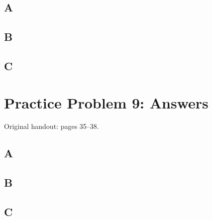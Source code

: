 \documentclass[letterpaper,12pt]{article}
\newcommand{\handout}[1]{%
  
}
\newenvironment{answer}{\par}{\par\medskip}
\begin{document}
\subsection*{A}
\begin{answer}
  \vspace{2cm}
\end{answer}

\subsection*{B}
\begin{answer}
  \vspace{2cm}
\end{answer}

\subsection*{C}
\begin{answer}
  \vspace{2cm}
\end{answer}

\clearpage

\handout{35-38}
\section*{Practice Problem 9: Answers}
\noindent Original handout: pages 35--38.\par

\subsection*{A}
\begin{answer}
  \vspace{2cm}
\end{answer}

\subsection*{B}
\begin{answer}
  \vspace{2cm}
\end{answer}

\subsection*{C}
\begin{answer}
  \vspace{2cm}
\end{answer}
\end{document}

